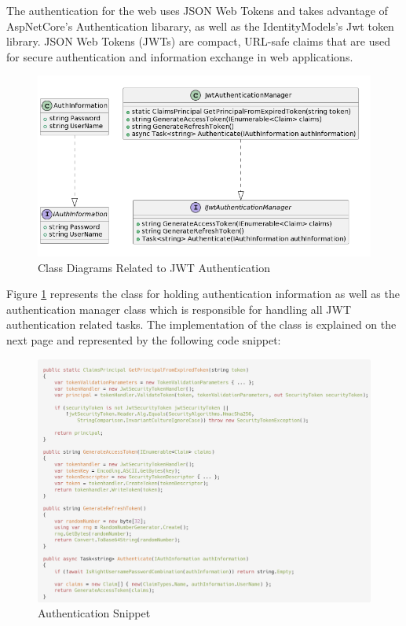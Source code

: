 The authentication for the web uses JSON Web Tokens and takes advantage of AspNetCore's Authentication libarary, as well as the IdentityModels's Jwt token library. JSON Web Tokens (JWTs) are compact, URL-safe claims that are used for secure authentication and information exchange in web applications.

\begin{figure}[H]
	\centering
	\includegraphics[width=0.8\linewidth]{img/authentication_classdiagram.png}
	\caption{Class Diagrams Related to JWT Authentication}
	\label{fig:acd}
\end{figure}

Figure \ref{fig:acd} represents the class for holding authentication information as well as the authentication manager class which is responsible for handling all JWT authentication related tasks. The implementation of the class is explained on the next page and represented by the following code snippet:

 \begin{figure}[H]
 	\centering
 	\includegraphics[width=1\linewidth]{img/code_jwt.png}
 	\caption{Authentication Snippet}
 	\label{fig:jwtcode}
 \end{figure}
 
